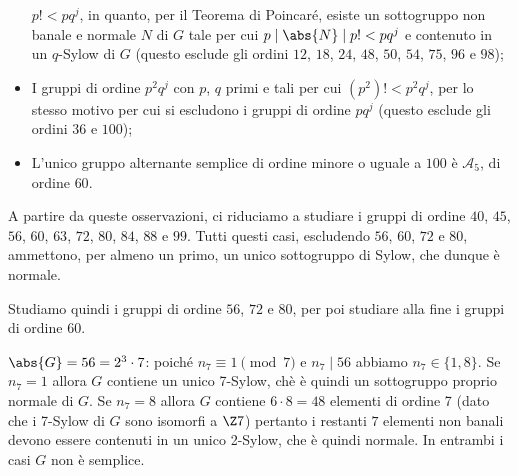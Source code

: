 \documentclass[11pt]{scrartcl}
\begin{document}
\begin{itemize}
		$p! < p q^j$, in quanto, per il Teorema di Poincaré, esiste un sottogruppo
		non banale e normale $N$ di $G$ tale per cui $p \mid \abs{N} \mid p! < p q^j$
		e contenuto in un $q$-Sylow di $G$ (questo esclude gli ordini $12$, $18$, $24$, $48$, $50$, $54$, $75$, $96$ e $98$);
		\item I gruppi di ordine $p^2 q^j$ con $p$, $q$ primi e tali per cui
		$(p^2)! < p^2 q^j$, per lo stesso motivo per cui si escludono i gruppi
		di ordine $p q^j$ (questo esclude gli ordini $36$ e $100$);
		\item L'unico gruppo alternante semplice di ordine minore o uguale a $100$ è $\mathcal{A}_5$, di ordine $60$.
	\end{itemize}
	
	A partire da queste osservazioni, ci riduciamo a studiare i gruppi di ordine $40$, $45$, $56$, $60$, $63$, $72$, $80$, $84$, $88$ e $99$. Tutti questi casi,
	escludendo $56$, $60$, $72$ e $80$, ammettono, per almeno un primo, un unico
	sottogruppo di Sylow, che dunque è normale. \medskip
	
	
	Studiamo quindi i gruppi di ordine $56$, $72$ e $80$, per poi studiare
	alla fine i gruppi di ordine $60$. \medskip
	
	\underline{$\abs{G} = 56 = 2^3\cdot 7$}: poiché $n_7 \equiv 1 \pmod 7$ e $n_7 \mid 56$ abbiamo
	$n_7 \in \{1, 8\}$. Se $n_7 = 1$ allora $G$ contiene un unico 7-Sylow, chè 
	è quindi un sottogruppo proprio normale di $G$. Se $n_7 = 8$ allora $G$ contiene
	$6\cdot8 = 48$ elementi di ordine 7 (dato che i 7-Sylow di $G$ sono isomorfi a $\Z7$)
	pertanto i restanti $7$ elementi non banali devono essere contenuti in un 
	unico 2-Sylow, che è quindi normale. In entrambi i casi $G$ non è semplice.
	\newline\newline
	
\end{document}
